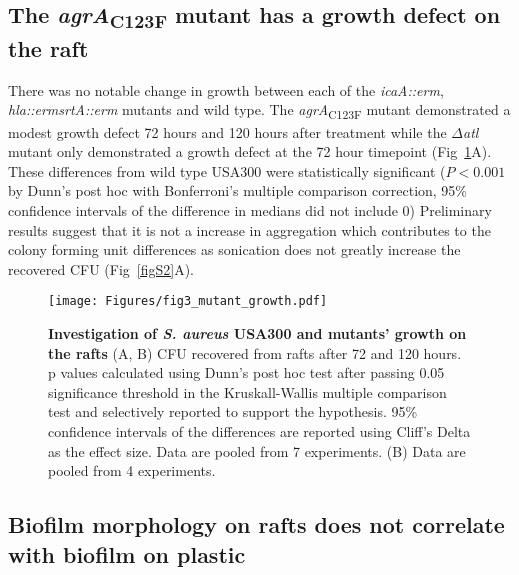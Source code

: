 \documentclass[10pt,letterpaper]{article}
\begin{document}
\subsection*{The \textit{agrA}\textsubscript{C123F} mutant has a growth defect on the raft}

There was no notable change in growth between each of the \textit{icaA::erm}, \textit{hla::erm}\textit{srtA::erm} mutants and wild type.
The \textit{agrA}\textsubscript{C123F} mutant demonstrated a modest growth defect 72 hours and 120 hours after treatment while the $\Delta$\textit{atl} mutant only demonstrated a growth defect at the 72 hour timepoint (Fig~\ref{fig3}A).
These differences from wild type USA300 were statistically significant ($P < 0.001$ by Dunn's post hoc with Bonferroni's multiple comparison correction, 95\% confidence intervals of the difference in medians did not include 0)
Preliminary results suggest that it is not a increase in aggregation which contributes to the colony forming unit differences as sonication does not greatly increase the recovered CFU (Fig~\ref{figS2}A).

\begin{figure}[!ht]
\begin{adjustwidth}{-2.25in}{0in}
\texttt{[image: Figures/fig3\_mutant\_growth.pdf]}
\caption[Investigation of \textit{S. aureus} USA300 and mutants' growth on the rafts]{
	\textbf{Investigation of \textit{S. aureus} USA300 and mutants' growth on the rafts}
	(A, B) CFU recovered from rafts after 72 and 120 hours. p values calculated using Dunn's post hoc test after passing 0.05 significance threshold in the Kruskall-Wallis multiple comparison test and selectively reported to support the hypothesis. 95\% confidence intervals of the differences are reported using Cliff's Delta as the effect size. Data are pooled from 7 experiments.
	(B) Data are pooled from 4 experiments.}
    \label{fig3}
    \end{adjustwidth}
\end{figure}

\subsection*{Biofilm morphology on rafts does not correlate with biofilm on plastic}
\end{document}
